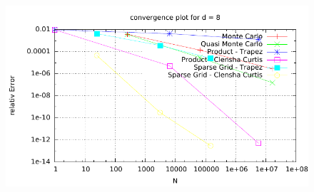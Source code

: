 \documentclass{article}
\begin{document}
\begin{figure}[htbp]
  \centering
     \includegraphics[width=1.0\textwidth]{../Task13/sh3_task13_convergencePlotd8.pdf}
\end{figure}
\end{document}
